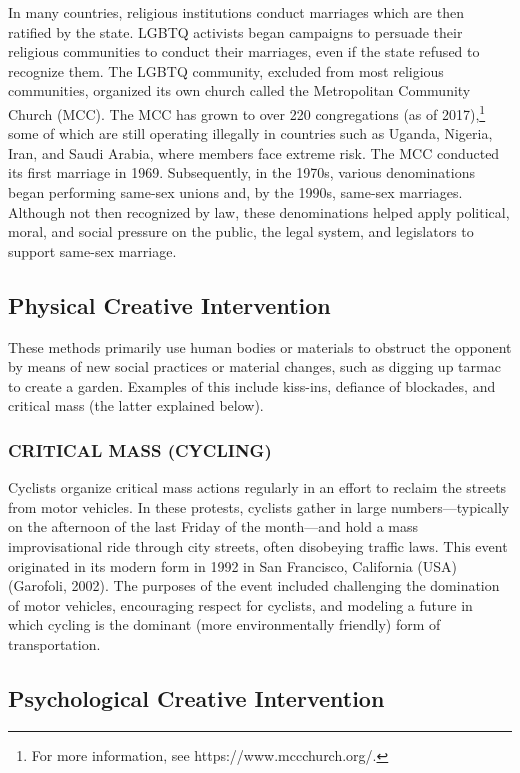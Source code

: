\documentclass[twoside,a4paper,12pt,fleqn,openany]{extbook}
\begin{document}
In many countries, religious institutions conduct marriages which are then ratified by the state. LGBTQ activists began campaigns to persuade their religious communities to conduct their marriages, even if the state refused to recognize them. The LGBTQ community, excluded from most religious communities, organized its own church called the Metropolitan Community Church (MCC). The MCC has grown to over 220 congregations (as of 2017),\footnote{For more information, see https://www.mccchurch.org/.} some of which are still operating illegally in countries such as Uganda, Nigeria, Iran, and Saudi Arabia, where members face extreme risk. The MCC conducted its first marriage in 1969. Subsequently, in the 1970s, various denominations began performing same-sex unions and, by the 1990s, same-sex marriages. Although not then recognized by law, these denominations helped apply political, moral, and social pressure on the public, the legal system, and legislators to support same-sex marriage.

\subsection*{Physical Creative Intervention}

These methods primarily use human bodies or materials to obstruct the opponent by means of new social practices or material changes, such as digging up tarmac to create a garden. Examples of this include kiss-ins, defiance of blockades, and critical mass (the latter explained below).

\subsubsection*{CRITICAL MASS (CYCLING)}

Cyclists organize critical mass actions regularly in an effort to reclaim the streets from motor vehicles. In these protests, cyclists gather in large numbers—typically on the afternoon of the last Friday of the month—and hold a mass improvisational ride through city streets, often disobeying traffic laws. This event originated in its modern form in 1992 in San Francisco, California (USA) (Garofoli, 2002). The purposes of the event included challenging the domination of motor vehicles, encouraging respect for cyclists, and modeling a future in which cycling is the dominant (more environmentally friendly) form of transportation.

\subsection*{Psychological Creative Intervention}
\end{document}
